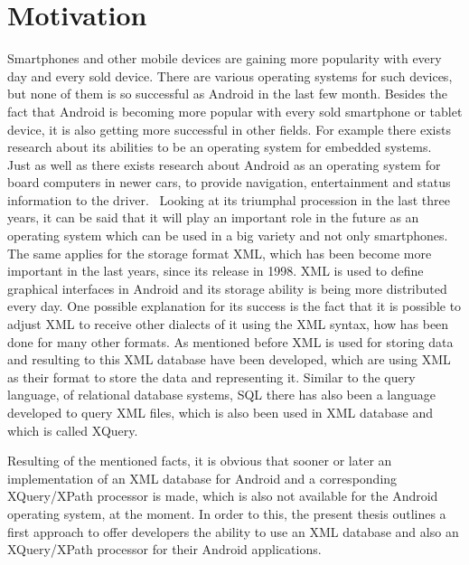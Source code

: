 \section{Motivation}
\label{sec:introduction:motivation}
Smartphones and other mobile devices are gaining more popularity with every day and every sold device.
There are various operating systems for such devices, but none of them is so successful as Android in the last few month.
Besides the fact that Android is becoming more popular with every sold smartphone or tablet device, it is also getting more successful in other fields.
For example there exists research about its abilities to be an operating system for embedded systems.~\cite{lee2010evaluating}~\cite{maia2010evaluating}
Just as well as there exists research about Android as an operating system for board computers in newer cars, to provide navigation, entertainment and status information to the driver.~\cite{macario2009vehicle}
Looking at its triumphal procession in the last three years, it can be said that it will play an important role in the future as an operating system which can be used in a big variety and not only smartphones.\\
The same applies for the storage format XML, which has been become more important in the last years, since its release in 1998.
XML is used to define graphical interfaces in Android and its storage ability is being more distributed every day.
One possible explanation for its success is the fact that it is possible to adjust XML to receive other dialects of it using the XML syntax, how has been done for many other formats.
As mentioned before XML is used for storing data and resulting to this XML database have been developed, which are using XML as their format to store the data and representing it.
Similar to the query language, of relational database systems, SQL there has also been a language developed to query XML files, which is also been used in XML database and which is called XQuery.




Resulting of the mentioned facts, it is obvious that sooner or later an implementation of an XML database for Android and a corresponding XQuery/XPath processor is made, which is also not available for the Android operating system, at the moment.
In order to this, the present thesis outlines a first approach to offer developers the ability to use an XML database and also an XQuery/XPath processor for their Android applications.



